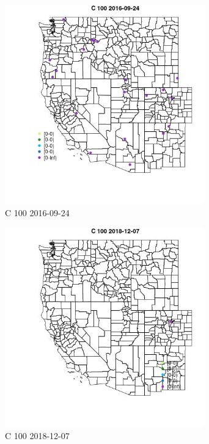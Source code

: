 \begin{figure} 
\centering  
\includegraphics[width=0.77\textwidth]{Code_Outputs/Report_ML_input_PM25_Step4_part_e_de_duplicated_aves_MapObsC_1002016-09-24.jpg} 
\caption{\label{fig:Report_ML_input_PM25_Step4_part_e_de_duplicated_avesMapObsC_1002016-09-24}C 100 2016-09-24} 
\end{figure} 
 

\begin{figure} 
\centering  
\includegraphics[width=0.77\textwidth]{Code_Outputs/Report_ML_input_PM25_Step4_part_e_de_duplicated_aves_MapObsC_1002018-12-07.jpg} 
\caption{\label{fig:Report_ML_input_PM25_Step4_part_e_de_duplicated_avesMapObsC_1002018-12-07}C 100 2018-12-07} 
\end{figure} 
 

